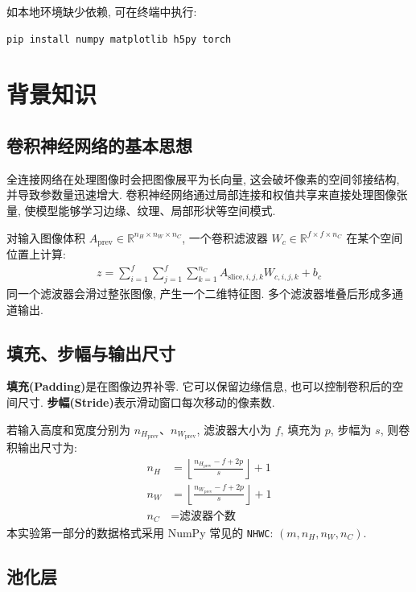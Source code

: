 \documentclass{../../nndlcourse}
\begin{document}
如本地环境缺少依赖, 可在终端中执行:
\begin{verbatim}
pip install numpy matplotlib h5py torch
\end{verbatim}


\section{背景知识}

\subsection{卷积神经网络的基本思想}

全连接网络在处理图像时会把图像展平为长向量, 这会破坏像素的空间邻接结构, 并导致参数量迅速增大. 卷积神经网络通过局部连接和权值共享来直接处理图像张量, 使模型能够学习边缘、纹理、局部形状等空间模式.

对输入图像体积 $A_{\mathrm{prev}}\in\mathbb{R}^{n_H\times n_W\times n_C}$, 一个卷积滤波器 $W_c\in\mathbb{R}^{f\times f\times n_C}$ 在某个空间位置上计算:
\begin{align}
    z = \sum_{i=1}^{f}\sum_{j=1}^{f}\sum_{k=1}^{n_C}
    A_{\mathrm{slice}, i,j,k} W_{c,i,j,k} + b_c
\end{align}
同一个滤波器会滑过整张图像, 产生一个二维特征图. 多个滤波器堆叠后形成多通道输出.

\subsection{填充、步幅与输出尺寸}

\textbf{填充(Padding)}是在图像边界补零. 它可以保留边缘信息, 也可以控制卷积后的空间尺寸. \textbf{步幅(Stride)}表示滑动窗口每次移动的像素数.

若输入高度和宽度分别为 $n_{H_{\mathrm{prev}}}$、$n_{W_{\mathrm{prev}}}$, 滤波器大小为 $f$, 填充为 $p$, 步幅为 $s$, 则卷积输出尺寸为:
\begin{align}
    n_H &= \left\lfloor \frac{n_{H_{\mathrm{prev}}}-f+2p}{s}\right\rfloor + 1 \\
    n_W &= \left\lfloor \frac{n_{W_{\mathrm{prev}}}-f+2p}{s}\right\rfloor + 1 \\
    n_C &= \text{滤波器个数}
\end{align}
本实验第一部分的数据格式采用 NumPy 常见的 \texttt{NHWC}: $(m,n_H,n_W,n_C)$.

\subsection{池化层}
\end{document}
